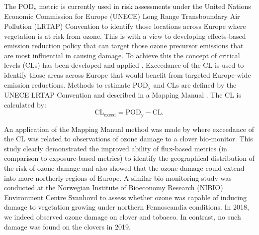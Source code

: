 \documentclass[bg, manuscript]{copernicus}
\begin{document}
The $\mathrm{POD_y}$ metric is currently used in risk assessments under the United Nations Economic Commission for Europe (UNECE) Long Range Transboundary Air Pollution (LRTAP) Convention to identify those locations across Europe where vegetation is at risk from ozone. This is with a view to developing effects-based emission reduction policy that can target those ozone precursor emissions that are most influential in causing damage. To achieve this the concept of critical levels (CLs) has been developed and applied \citep{Maas2016}. Exceedance of the CL is used to identify those areas across Europe that would benefit from targeted Europe-wide emission reductions. Methods to estimate $\mathrm{POD_y}$ and CLs are defined by the UNECE LRTAP Convention and described in a Mapping Manual \citep{ICP:MappingManual2017}. The CL is calculated by: 
%
\begin{equation}
  \mathrm{CL_{exeed}} = \mathrm{POD_y} - \mathrm{CL}.
\end{equation}
%

An application of the Mapping Manual method was made by \citet{GCB:Mills2011} where exceedance of the CL was related to observations of ozone damage to a clover bio-monitor. This study clearly demonstrated the improved ability of flux-based metrics (in comparison to exposure-based metrics) to identify the geographical distribution of the risk of ozone damage and also showed that the ozone damage could extend into more northerly regions of Europe. A similar bio-monitoring study was conducted at the Norwegian Institute of Bioeconomy Research (NIBIO) Environment Centre Svanhovd to assess whether ozone was capable of inducing damage to vegetation growing under northern Fennoscandia conditions. In 2018, we indeed observed ozone damage on clover and tobacco. In contrast, no such damage was found on the clovers in 2019.
\end{document}
